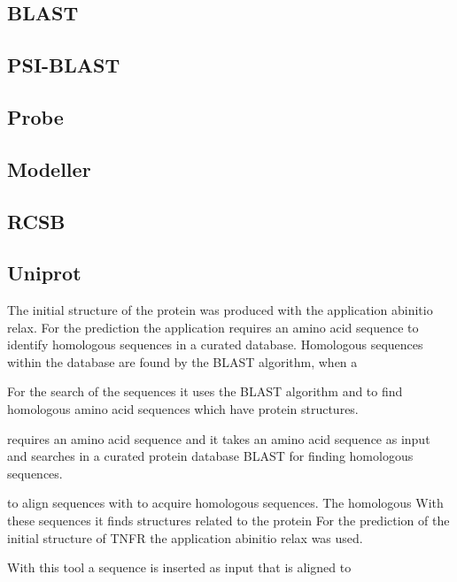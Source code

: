\subsection{BLAST}
\label{subsec:MM_BLAST}

\subsection{PSI-BLAST}
\label{subsec:MM_PSI_BLAST}


\subsection{Probe}
\label{subsec:MM_Probe}

\subsection{Modeller}
\label{subsec:MM_Modeller}

\subsection{RCSB}
\label{subsec:MM_RCSB}

\subsection{Uniprot}
\label{subsec:MM_Uniprot}




 The initial structure of the protein was produced with the application abinitio relax. For the prediction the application requires an amino acid sequence to identify homologous sequences in a curated database. Homologous sequences within the database are found by the BLAST algorithm, when a

For the search of the sequences it uses the BLAST algorithm and to find homologous amino acid sequences which have protein structures.

requires an amino acid sequence and  it takes an amino acid sequence as input and searches in a curated protein database BLAST for finding homologous sequences. 


to align sequences with to acquire homologous sequences.  The homologous With these sequences it finds structures related to the protein
For the prediction of the initial structure of TNFR the application abinitio relax was used. 

With this tool a sequence is inserted as input that is aligned to 
 


